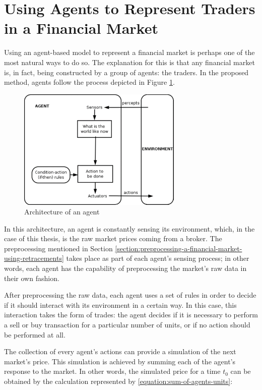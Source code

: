 \section{Using Agents to Represent Traders in a Financial Market}
\label{section:using-agents-to-represent-traders-in-a-financial-market}

Using an agent-based model to represent a financial market is perhaps one of the
most natural ways to do so. The explanation for this is that any financial
market is, in fact, being constructed by a group of agents: the traders. In the
proposed method, agents follow the process depicted in Figure
\ref{figure:agent-architecture}.

\begin{figure}
\centering
\includegraphics[width=0.7\textwidth]{img/agent-architecture.png}
\caption{Architecture of an agent}
\label{figure:agent-architecture}
\end{figure}

In this architecture, an agent is constantly sensing its environment, which, in
the case of this thesis, is the raw market prices coming from a broker. The
preprocessing mentioned in Section
\ref{section:preprocessing-a-financial-market-using-retracements} takes place as
part of each agent's sensing process; in other words, each agent has the
capability of preprocessing the market's raw data in their own fashion.

After preprocessing the raw data, each agent uses a set of rules in order to
decide if it should interact with its environment in a certain way. In this
case, this interaction takes the form of trades: the agent decides if it is
necessary to perform a sell or buy transaction for a particular number of units,
or if no action should be performed at all.

The collection of every agent's actions can provide a simulation of the next
market's price. This simulation is achieved by summing each of the agent's
response to the market. In other words, the simulated price for a time $t_0$ can
be obtained by the calculation represented by \ref{equation:sum-of-agents-units}:

